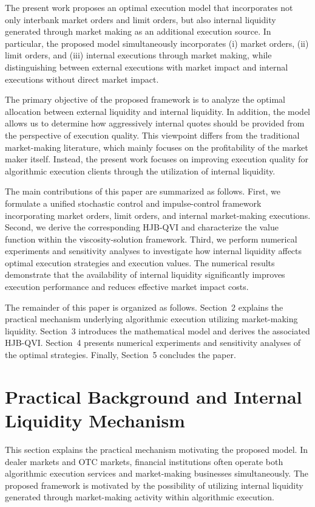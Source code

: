 \documentclass[12pt]{article}
\begin{document}
The present work proposes an optimal execution model that incorporates not only interbank market orders and limit orders, but also internal liquidity generated through market making as an additional execution source. 
In particular, the proposed model simultaneously incorporates
(i) market orders,
(ii) limit orders,
and
(iii) internal executions through market making,
while distinguishing between external executions with market impact and internal executions without direct market impact.

The primary objective of the proposed framework is to analyze the optimal allocation between external liquidity and internal liquidity. 
In addition, the model allows us to determine how aggressively internal quotes should be provided from the perspective of execution quality. 
This viewpoint differs from the traditional market-making literature, which mainly focuses on the profitability of the market maker itself. 
Instead, the present work focuses on improving execution quality for algorithmic execution clients through the utilization of internal liquidity.

The main contributions of this paper are summarized as follows.
First, we formulate a unified stochastic control and impulse-control framework incorporating market orders, limit orders, and internal market-making executions. 
Second, we derive the corresponding HJB-QVI and characterize the value function within the viscosity-solution framework. 
Third, we perform numerical experiments and sensitivity analyses to investigate how internal liquidity affects optimal execution strategies and execution values. 
The numerical results demonstrate that the availability of internal liquidity significantly improves execution performance and reduces effective market impact costs.

The remainder of this paper is organized as follows.
Section~2 explains the practical mechanism underlying algorithmic execution utilizing market-making liquidity. 
Section~3 introduces the mathematical model and derives the associated HJB-QVI. 
Section~4 presents numerical experiments and sensitivity analyses of the optimal strategies. 
Finally, Section~5 concludes the paper.

\section{Practical Background and Internal Liquidity Mechanism}

This section explains the practical mechanism motivating the proposed model. 
In dealer markets and OTC markets, financial institutions often operate both algorithmic execution services and market-making businesses simultaneously. 
The proposed framework is motivated by the possibility of utilizing internal liquidity generated through market-making activity within algorithmic execution.
\end{document}
